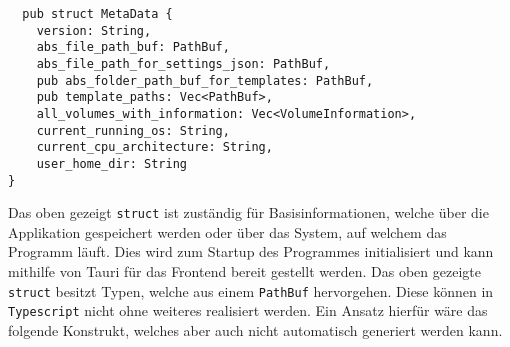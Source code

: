 \begin{verbatim}
  pub struct MetaData {
    version: String,
    abs_file_path_buf: PathBuf,
    abs_file_path_for_settings_json: PathBuf,
    pub abs_folder_path_buf_for_templates: PathBuf,
    pub template_paths: Vec<PathBuf>,
    all_volumes_with_information: Vec<VolumeInformation>,
    current_running_os: String,
    current_cpu_architecture: String,
    user_home_dir: String
}
\end{verbatim}


Das oben gezeigt \verb|struct| ist zuständig für Basisinformationen, welche über die Applikation gespeichert werden oder über
das System, auf welchem das Programm läuft. Dies wird zum Startup des Programmes initialisiert und kann mithilfe von Tauri für das
Frontend bereit gestellt werden.
Das oben gezeigte \verb|struct| besitzt Typen, welche aus einem \verb|PathBuf| hervorgehen. Diese können in
\verb|Typescript| nicht ohne weiteres realisiert werden. Ein Ansatz hierfür wäre das folgende Konstrukt, welches aber auch nicht
automatisch generiert werden kann.

